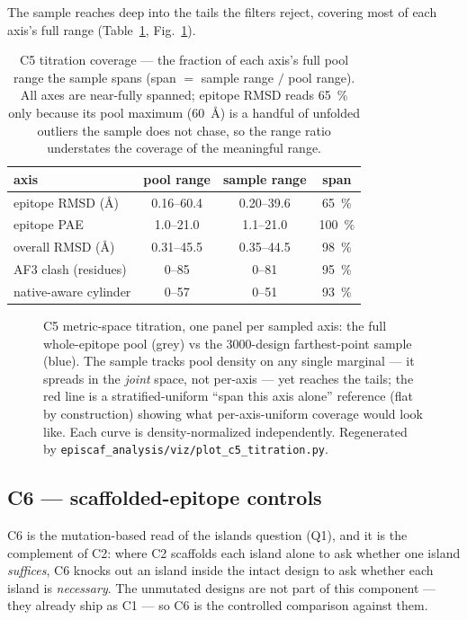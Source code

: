 The sample reaches deep into the tails the filters reject, covering most of each axis's full range
(Table~\ref{tab:c5span}, Fig.~\ref{fig:c5span}).

\begin{table}[h]\centering\small
\begin{tabular}{lccc}
\toprule
axis & pool range & sample range & span \\
\midrule
epitope RMSD (\si{\angstrom}) & 0.16--60.4 & 0.20--39.6 & \SI{65}{\percent} \\
epitope PAE                   & 1.0--21.0  & 1.1--21.0  & \SI{100}{\percent} \\
overall RMSD (\si{\angstrom}) & 0.31--45.5 & 0.35--44.5 & \SI{98}{\percent} \\
AF3 clash (residues)          & 0--85      & 0--81      & \SI{95}{\percent} \\
native-aware cylinder         & 0--57      & 0--51      & \SI{93}{\percent} \\
\bottomrule
\end{tabular}
\caption{C5 titration coverage --- the fraction of each axis's full pool range the sample spans (span
$=$ sample range $/$ pool range). All axes are near-fully spanned; epitope RMSD reads \SI{65}{\percent}
only because its pool maximum (\SI{60}{\angstrom}) is a handful of unfolded outliers the sample does not
chase, so the range ratio understates the coverage of the meaningful range.}
\label{tab:c5span}
\end{table}

\begin{figure}[h]\centering
{}
\caption{C5 metric-space titration, one panel per sampled axis: the full whole-epitope pool (grey) vs the
\num{3000}-design farthest-point sample (blue). The sample tracks pool density on any single marginal ---
it spreads in the \emph{joint} space, not per-axis --- yet reaches the tails; the red line is a
stratified-uniform ``span this axis alone'' reference (flat by construction) showing what per-axis-uniform
coverage would look like. Each curve is density-normalized independently. Regenerated by
\texttt{episcaf\_analysis/viz/plot\_c5\_titration.py}.}
\label{fig:c5span}
\end{figure}

\subsection{C6 --- scaffolded-epitope controls}\label{sec:dp4c6}
C6 is the mutation-based read of the islands question (Q1), and it is the complement of C2: where C2
scaffolds each island alone to ask whether one island \emph{suffices}, C6 knocks out an island inside the
intact design to ask whether each island is \emph{necessary}. The unmutated designs are not part of this
component --- they already ship as C1 --- so C6 is the controlled comparison against them.

